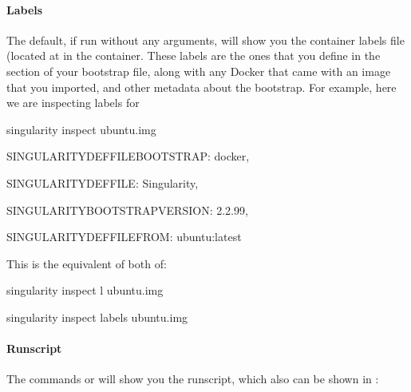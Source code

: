 \documentclass[letterpaper,10pt,english]{sphinxmanual}
\begin{document}
\paragraph{Labels}
\label{\detokenize{appendix:labels}}
The default, if run without any arguments, will show you the container
labels file (located at  in the container. These labels are the ones that
you define in the  section of your bootstrap file, along with any Docker 
that came with an image that you imported, and other metadata about the
bootstrap. For example, here we are inspecting labels for 

%
\begin{sphinxVerbatim}[commandchars=\\\{\}]
\PYGZdl{} singularity inspect ubuntu.img

\PYGZob{}

    \PYGZdq{}SINGULARITY\PYGZus{}DEFFILE\PYGZus{}BOOTSTRAP\PYGZdq{}: \PYGZdq{}docker\PYGZdq{},

    \PYGZdq{}SINGULARITY\PYGZus{}DEFFILE\PYGZdq{}: \PYGZdq{}Singularity\PYGZdq{},

    \PYGZdq{}SINGULARITY\PYGZus{}BOOTSTRAP\PYGZus{}VERSION\PYGZdq{}: \PYGZdq{}2.2.99\PYGZdq{},

    \PYGZdq{}SINGULARITY\PYGZus{}DEFFILE\PYGZus{}FROM\PYGZdq{}: \PYGZdq{}ubuntu:latest\PYGZdq{}

\PYGZcb{}
\end{sphinxVerbatim}

This is the equivalent of both of:

%
\begin{sphinxVerbatim}[commandchars=\\\{\}]
\PYGZdl{} singularity inspect \PYGZhy{}l ubuntu.img

\PYGZdl{} singularity inspect \PYGZhy{}\PYGZhy{}labels ubuntu.img
\end{sphinxVerbatim}


\paragraph{Runscript}
\label{\detokenize{appendix:runscript}}
The commands  or  will show you the runscript, which also can be shown in :
\end{document}
